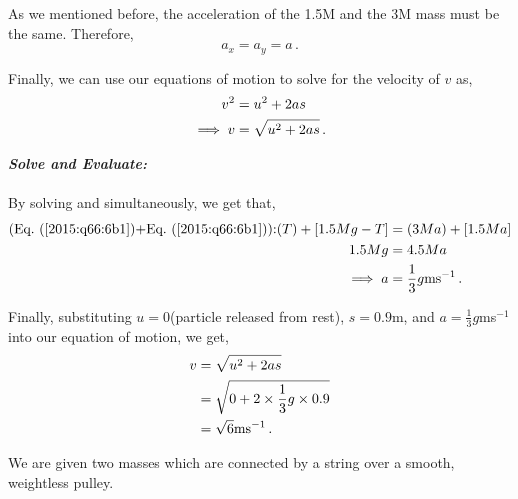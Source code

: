 \begin{subquestions}
	As we mentioned before, the acceleration of the 1.5M and the 3M mass must be the same. Therefore,
	\begin{equation}
		a_x=a_y=a \,.
	\end{equation}

	Finally, we can use our equations of motion to solve for the velocity of $v$ as,
	\begin{align}
		v^2 & = u^2 +2as \nonumber \\
		\implies v & = \sqrt{u^2+2as} \,.
	\end{align}

	\textbf{\textit{Solve and Evaluate:}} \\ \\
	By solving  and  simultaneously, we get that,
	\begin{align}
		\text{(\req{2015:q66:6b1}+\req{2015:q66:6b1}):} (T)+[1.5Mg-T] & = (3Ma)+[1.5Ma] \nn \\
		1.5Mg & = 4.5Ma \nn \\
		\implies a & = \frac{1}{3}g \text{ms}^{-1} \,.
	\end{align}
	
	Finally, substituting $u=0$(particle released from rest), $s=0.9$m, and $a=\frac{1}{3}g$ms$^{-1}$ into our equation of motion, we get,
	\begin{align}
		v & = \sqrt{u^2+2as} \nonumber \\
		  & = \sqrt{0+2\times \frac{1}{3}g\times 0.9} \nonumber \\
		  & = \sqrt{6} \text{ms}^{-1} \,.
	\end{align}
	
	
	\subquestion
	We are given two masses which are connected by a string over a smooth, weightless pulley.
	

\end{subquestions}

